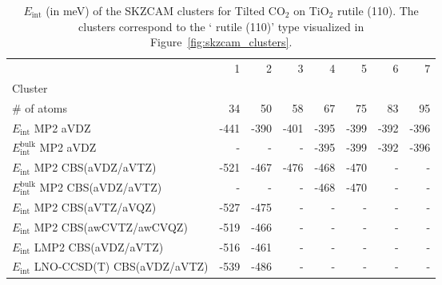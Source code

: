 \begin{table}
\caption{\label{tab:system_eint_r-tio2_co2_tilted}$E_\textrm{int}$ (in meV) of the SKZCAM clusters for Tilted CO$_2$ on TiO$_2$ rutile (110). The clusters correspond to the ` rutile (110)' type visualized in Figure~\ref{fig:skzcam_clusters}.}
\begin{adjustbox}{center,max width=1.4\textwidth}
\begin{tabular}{lrrrrrrr}
\toprule
 & 1 & 2 & 3 & 4 & 5 & 6 & 7 \\ 
Cluster &  &  &  &  &  &  &  \\
\midrule
\# of atoms & 34 & 50 & 58 & 67 & 75 & 83 & 95 \\
$E_\textrm{int}$ MP2 aVDZ & -441 & -390 & -401 & -395 & -399 & -392 & -396 \\
$E_\textrm{int}^\textrm{bulk}$ MP2 aVDZ & - & - & - & -395 & -399 & -392 & -396 \\
$E_\textrm{int}$ MP2 CBS(aVDZ/aVTZ) & -521 & -467 & -476 & -468 & -470 & - & - \\
$E_\textrm{int}^\textrm{bulk}$ MP2 CBS(aVDZ/aVTZ) & - & - & - & -468 & -470 & - & - \\
$E_\textrm{int}$ MP2 CBS(aVTZ/aVQZ) & -527 & -475 & - & - & - & - & - \\
$E_\textrm{int}$ MP2 CBS(awCVTZ/awCVQZ) & -519 & -466 & - & - & - & - & - \\
$E_\textrm{int}$ LMP2 CBS(aVDZ/aVTZ) & -516 & -461 & - & - & - & - & - \\
$E_\textrm{int}$ LNO-CCSD(T) CBS(aVDZ/aVTZ) & -539 & -486 & - & - & - & - & - \\
\bottomrule
\end{tabular}
\end{adjustbox}
\end{table}

